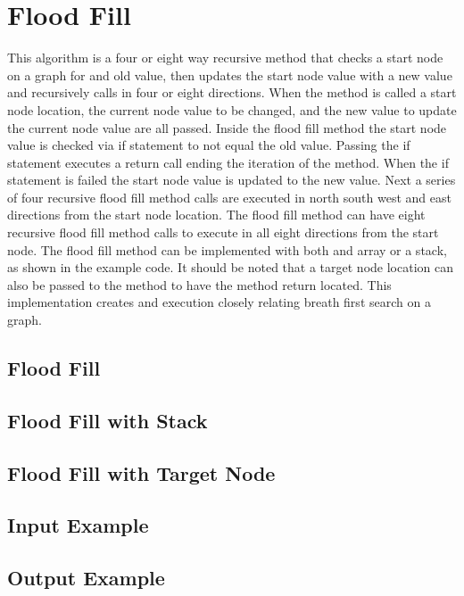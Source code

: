 \section{Flood Fill}
This algorithm is a four or eight way recursive method that checks a start node on a graph for and old value, then updates the start node value with a new value and recursively calls in four or eight directions.
When the method is called a start node location, the current node value to be changed, and the new value to update the current node value are all passed.
Inside the flood fill method the start node value is checked via if statement to not equal the old value.
Passing the if statement executes a return call ending the iteration of the method.
When the if statement is failed the start node value is updated to the new value.     
Next a series of four recursive flood fill method calls are executed in north south west and east directions from the start node location. 
The flood fill method can have eight recursive flood fill method calls to execute in all eight directions from the start node. 
The flood fill method can be implemented with both and array or a stack, as shown in the example code.
It should be noted that a target node location can also be passed to the method to have the method return located. 
This implementation creates and execution closely relating breath first search on a graph. 

\subsection{Flood Fill}

\subsection{Flood Fill with Stack}

\subsection{Flood Fill with Target Node}

\subsection{Input Example}

\subsection{Output Example}

